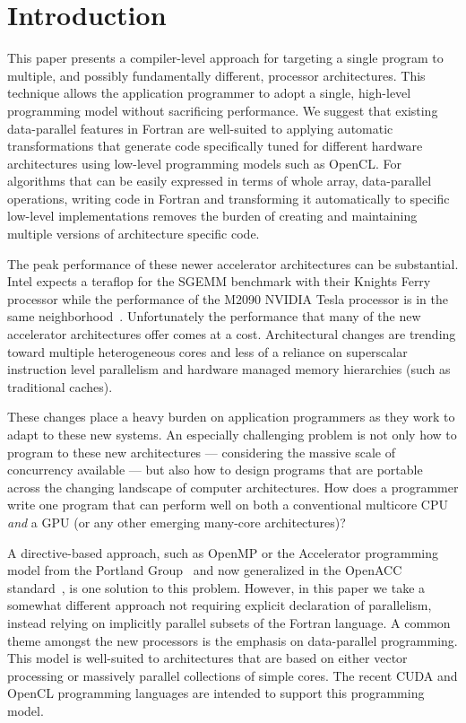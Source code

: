 \section{Introduction}
\label{sec:intro}

This paper presents a compiler-level approach for targeting a single
program to multiple, and possibly fundamentally different, processor
architectures.  This technique allows the application programmer to
adopt a single, high-level programming model without sacrificing
performance.  We suggest that existing data-parallel features in
Fortran are well-suited to applying automatic transformations that
generate code specifically tuned for different hardware architectures
using low-level programming models such as OpenCL.  For algorithms
that can be easily expressed in terms of whole array, data-parallel
operations, writing code in Fortran and transforming it automatically
to specific low-level implementations removes the burden of creating
and maintaining multiple versions of architecture specific code.

The peak performance of these newer accelerator architectures can be
substantial.  Intel expects a teraflop for the SGEMM benchmark with
their Knights Ferry processor while the performance of the M2090
NVIDIA Tesla processor is in the same
neighborhood~\citep{hpcwire11manycore}.  Unfortunately the performance
that many of the new accelerator architectures offer comes at a cost.
Architectural changes are trending toward multiple heterogeneous cores
and less of a reliance on superscalar instruction level parallelism
and hardware managed memory hierarchies (such as traditional caches).

These changes place a heavy burden on application programmers as they
work to adapt to these new systems.  An especially challenging problem
is not only how to program to these new architectures --- considering
the massive scale of concurrency available --- but also how to design
programs that are portable across the changing landscape of computer
architectures.  How does a programmer write one program that can
perform well on both a conventional multicore CPU \emph{and} a GPU (or
any other emerging many-core architectures)?

A directive-based approach, such as OpenMP or the Accelerator
programming model from the Portland Group~\citep{pgi10accelerator} and
now generalized in the OpenACC standard~\citep{openacc11std}, is one
solution to this problem.  However, in this paper we take a somewhat
different approach not requiring explicit declaration of parallelism,
instead relying on implicitly parallel subsets of the Fortran
language.  A common theme amongst the new processors is the emphasis
on data-parallel programming.  This model is well-suited to
architectures that are based on either vector processing or massively
parallel collections of simple cores.  The recent CUDA and OpenCL
programming languages are intended to support this programming model.

